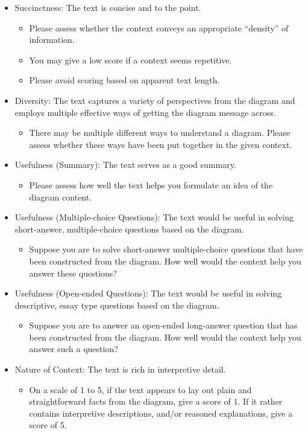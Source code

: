 \begin{tcolorbox}
\begin{itemize}
    \item Succinctness: The text is concise and to the point.
    \begin{itemize}
        \item Please assess whether the context conveys an appropriate ``density'' of information.
        \item You may give a low score if a context seems repetitive.
        \item Please avoid scoring based on apparent text length.
    \end{itemize}
    \item Diversity: The text captures a variety of perspectives from the diagram and employs multiple effective ways of getting the diagram message across.
    \begin{itemize}
        \item There may be multiple different ways to understand a diagram. Please assess whether these ways have been put together in the given context.
    \end{itemize}
    \item Usefulness (Summary): The text serves as a good summary.
    \begin{itemize}
        \item Please assess how well the text helps you formulate an idea of the diagram content.
    \end{itemize}
    \item Usefulness (Multiple-choice Questions): The text would be useful in solving short-answer, multiple-choice questions based on the diagram.
    \begin{itemize}
        \item Suppose you are to solve short-answer multiple-choice questions that have been constructed from the diagram. How well would the context help you answer these questions?
    \end{itemize}
    \item Usefulness (Open-ended Questions): The text would be useful in solving descriptive, essay type questions based on the diagram.
    \begin{itemize}
        \item Suppose you are to answer an open-ended long-answer question that has been constructed from the diagram. How well would the context help you answer such a question?
    \end{itemize}
    \item Nature of Context: The text is rich in interpretive detail.
    \begin{itemize}
        \item On a scale of 1 to 5, if the text appears to lay out plain and straightforward facts from the diagram, give a score of 1. If it rather contains interpretive descriptions, and/or reasoned explanations, give a score of 5.
    \end{itemize}
\end{itemize}

\end{tcolorbox}
